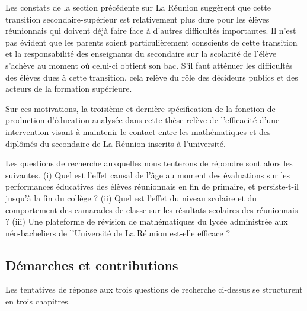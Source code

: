 \documentclass[
]{book}
\begin{document}
Les constats de la section précédente sur La Réunion suggèrent que cette transition secondaire-supérieur est relativement plus dure pour les élèves réunionnais qui doivent déjà faire face à d'autres difficultés importantes. Il n'est pas évident que les parents soient particulièrement conscients de cette transition et la responsabilité des enseignants du secondaire sur la scolarité de l'élève s'achève au moment où celui-ci obtient son bac. S'il faut atténuer les difficultés des élèves dues à cette transition, cela relève du rôle des décideurs publics et des acteurs de la formation supérieure.

Sur ces motivations, la troisième et dernière spécification de la fonction de production d'éducation analysée dans cette thèse relève de l'efficacité d'une intervention visant à maintenir le contact entre les mathématiques et des diplômés du secondaire de La Réunion inscrits à l'université.

\quad Les questions de recherche auxquelles nous tenterons de répondre sont alors les suivantes. (i) Quel est l'effet causal de l'âge au moment des évaluations sur les performances éducatives des élèves réunionnais en fin de primaire, et persiste-t-il jusqu'à la fin du collège ? (ii) Quel est l'effet du niveau scolaire et du comportement des camarades de classe sur les résultats scolaires des réunionnais ? (iii) Une plateforme de révision de mathématiques du lycée administrée aux néo-bacheliers de l'Université de La Réunion est-elle efficace ?

\hypertarget{duxe9marches-et-contributions}{%
\subsection*{Démarches et contributions}\label{duxe9marches-et-contributions}}

Les tentatives de réponse aux trois questions de recherche ci-dessus se structurent en trois chapitres.
\end{document}
